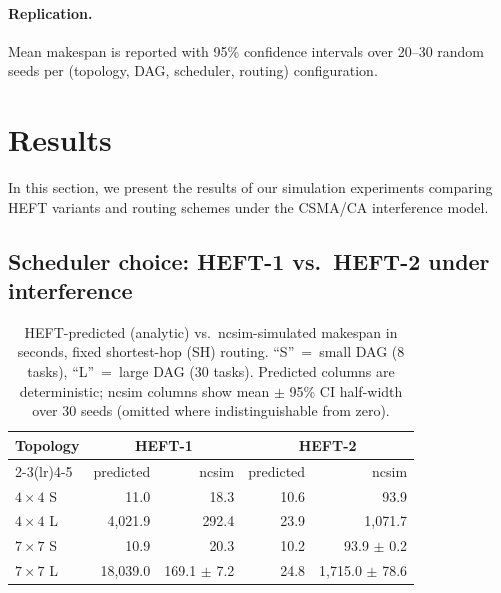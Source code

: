 \documentclass[conference]{IEEEtran}
\newcommand{\heftone}{HEFT-1}
\newcommand{\hefttwo}{HEFT-2}
\begin{document}
\paragraph{Replication.} Mean makespan is reported with 95\% confidence
intervals over 20--30 random seeds per (topology, DAG, scheduler, routing)
configuration.

\section{Results}
\label{sec:results}

In this section, we present the results of our simulation experiments
comparing HEFT variants and routing schemes under the CSMA/CA interference
model.

\subsection{Scheduler choice: \heftone{} vs.\ \hefttwo{} under interference}
\label{sec:results-heft}

\begin{table}[t]
\centering
\caption{HEFT-predicted (analytic) vs.\ ncsim-simulated makespan in
seconds, fixed shortest-hop (SH) routing. ``S''~=~small DAG (8 tasks),
``L''~=~large DAG (30 tasks). Predicted columns are deterministic;
ncsim columns show mean $\pm$ 95\% CI half-width over 30 seeds (omitted
where indistinguishable from zero).}
\label{tab:heft-vs-sim}
\small
\setlength{\tabcolsep}{4pt}
\begin{tabular}{l r r r r}
\toprule
\textbf{Topology}
  & \multicolumn{2}{c}{\textbf{\heftone{}}}
  & \multicolumn{2}{c}{\textbf{\hefttwo{}}} \\
\cmidrule(lr){2-3}\cmidrule(lr){4-5}
  & predicted & ncsim & predicted & ncsim \\
\midrule
$4\times4$ S & 11.0    & 18.3                    & 10.6 & 93.9                     \\
$4\times4$ L & 4{,}021.9  & 292.4                & 23.9 & 1{,}071.7                \\
$7\times7$ S & 10.9    & 20.3                    & 10.2 & 93.9 $\pm$ 0.2           \\
$7\times7$ L & 18{,}039.0 & 169.1 $\pm$ 7.2      & 24.8 & 1{,}715.0 $\pm$ 78.6     \\
\bottomrule
\end{tabular}
\end{table}
\end{document}

